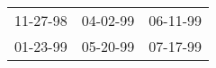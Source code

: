 \begin{supertabular}{lll}
 11-27-98\textsuperscript{} &  04-02-99\textsuperscript{} &  06-11-99\textsuperscript{} \\
 01-23-99\textsuperscript{} &  05-20-99\textsuperscript{} &  07-17-99\textsuperscript{} \\
\end{supertabular}
